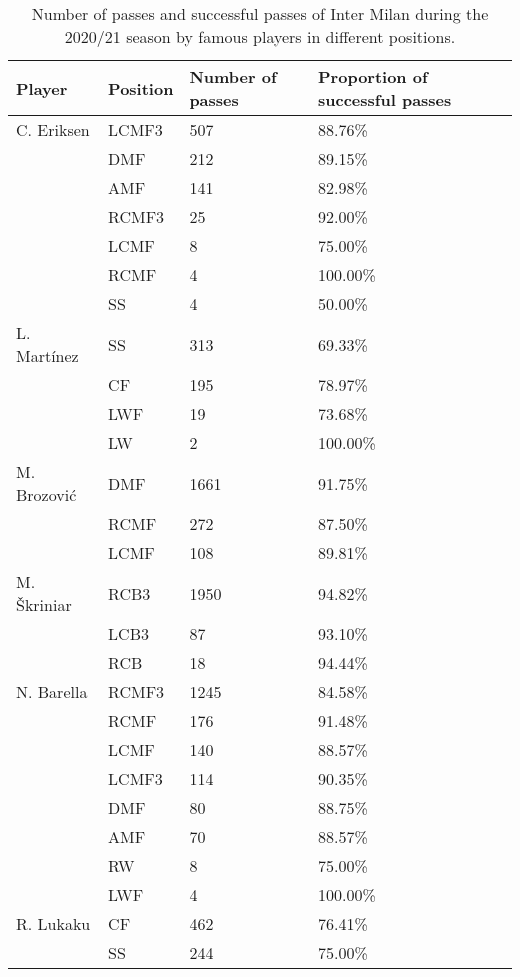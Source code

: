 \begin{table}[!htbp]
\small
\centering
\caption{Number of passes and successful passes of Inter Milan during the 2020/21 season by famous players in different positions.}\s

\label{app:inter_famous}
\begin{tabular}{@{}llll@{}}
\toprule
Player & Position & Number of passes & Proportion of successful passes \\ \midrule
C. Eriksen  & LCMF3           & 507              & 88.76\%         \\
  & DMF             & 212              & 89.15\%         \\
  & AMF             & 141              & 82.98\%         \\
  & RCMF3           & 25               & 92.00\%         \\
  & LCMF            & 8                & 75.00\%         \\
  & RCMF            & 4                & 100.00\%        \\
  & SS              & 4                & 50.00\%         \\
L. Martínez & SS              & 313              & 69.33\%         \\
 & CF              & 195              & 78.97\%         \\
 & LWF             & 19               & 73.68\%         \\
 & LW              & 2                & 100.00\%        \\
M. Brozović & DMF             & 1661             & 91.75\%         \\
 & RCMF            & 272              & 87.50\%         \\
 & LCMF            & 108              & 89.81\%         \\
M. Škriniar & RCB3            & 1950             & 94.82\%         \\
 & LCB3            & 87               & 93.10\%         \\
 & RCB             & 18               & 94.44\%         \\
N. Barella  & RCMF3           & 1245             & 84.58\%         \\
  & RCMF            & 176              & 91.48\%         \\
  & LCMF            & 140              & 88.57\%         \\
  & LCMF3           & 114              & 90.35\%         \\
  & DMF             & 80               & 88.75\%         \\
  & AMF             & 70               & 88.57\%         \\
  & RW              & 8                & 75.00\%         \\
  & LWF             & 4                & 100.00\%        \\
R. Lukaku   & CF              & 462              & 76.41\%         \\
   & SS              & 244              & 75.00\%         \\ \bottomrule
\end{tabular}
\end{table}